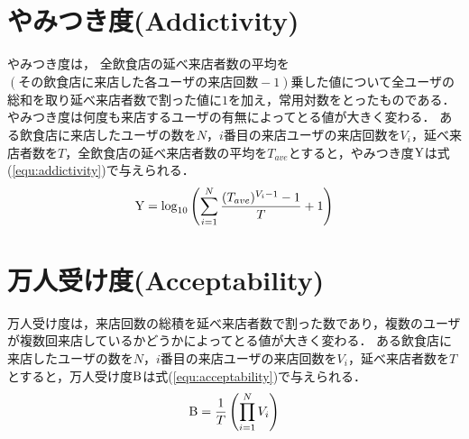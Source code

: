 \section{やみつき度(Addictivity)}

やみつき度は，%
全飲食店の延べ来店者数の平均を$(その飲食店に来店した各ユーザの来店回数-1)$乗した値について全ユーザの総和を取り延べ来店者数で割った値に$1$を加え，常用対数をとったものである．
やみつき度は何度も来店するユーザの有無によってとる値が大きく変わる．
ある飲食店に来店したユーザの数を$N$，$i$番目の来店ユーザの来店回数を$V_i$，延べ来店者数を$T$，全飲食店の延べ来店者数の平均を$T_{ave}$とすると，やみつき度$\rm Y$は式(\ref{equ:addictivity})で与えられる．
\begin{equation}
	\label{equ:addictivity}
	{\rm Y} = \log_{10}{\left(\sum^{N}_{i=1} \frac{(T_{ave})^{V_i-1}-1}{T}+1\right)}
\end{equation}

\section{万人受け度(Acceptability)}

万人受け度は，来店回数の総積を延べ来店者数で割った数であり，複数のユーザが複数回来店しているかどうかによってとる値が大きく変わる．
ある飲食店に来店したユーザの数を$N$，$i$番目の来店ユーザの来店回数を$V_i$，延べ来店者数を$T$とすると，万人受け度$\rm B$は式(\ref{equ:acceptability})で与えられる．
\begin{equation}
	\label{equ:acceptability}
	{\rm B} = \frac{1}{T} \left(\prod^N_{i=1}V_i\right)
\end{equation}

